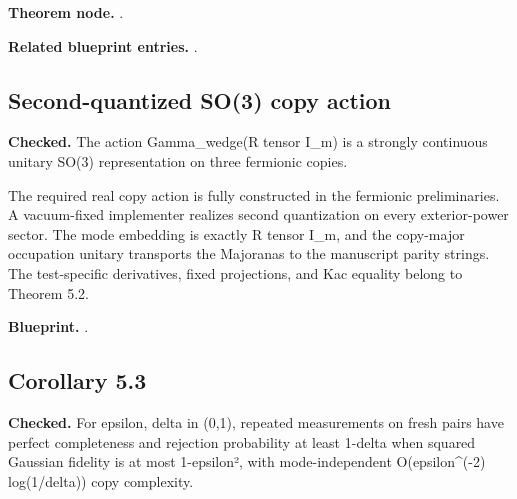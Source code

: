 \textbf{Theorem node.} .

\textbf{Related blueprint entries.} .

\subsection{Second-quantized SO(3) copy action}\label{paper:fermion-copy-action}
\textbf{Checked.} The action Gamma\_wedge(R tensor I\_m) is a strongly continuous unitary SO(3) representation on three fermionic copies. 

The required real copy action is fully constructed in the fermionic preliminaries. A vacuum-fixed implementer realizes second quantization on every exterior-power sector. The mode embedding is exactly R tensor I\_m, and the copy-major occupation unitary transports the Majoranas to the manuscript parity strings. The test-specific derivatives, fixed projections, and Kac equality belong to Theorem 5.2.


\textbf{Blueprint.} .

\subsection{Corollary 5.3}\label{paper:r5-3}
\textbf{Checked.} For epsilon, delta in (0,1), repeated measurements on fresh pairs have perfect completeness and rejection probability at least 1-delta when squared Gaussian fidelity is at most 1-epsilon², with mode-independent O(epsilon\textasciicircum{}(-2) log(1/delta)) copy complexity. 


